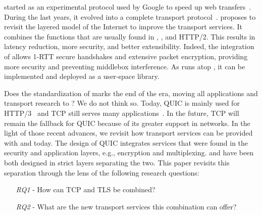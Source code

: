 \quic started as an experimental protocol used by Google to speed up web
transfers~\cite{roskind2013quic,langley2017quic}. During the last years, it
evolved into a complete transport protocol~\cite{rfc9000}.
\quic proposes to revisit the layered model of the Internet to improve the 
transport services. It combines the functions that are usually found in \tcp, 
\tls, and HTTP/2. This results in latency reduction, more security, and better 
extensibility. Indeed, the integration of  allows 1-RTT secure 
handshakes and extensive packet encryption, providing more security and 
preventing middlebox interference.
As \quic runs atop \udp, it can be implemented and deployed as a user-space library.

Does the standardization of \quic marks the end of the \tcp era, moving
all applications and transport research to \quic?  We do not think
so. Today, QUIC is mainly used for HTTP/3~\cite{http3} and TCP still serves many applications~\cite{covid19,fiveyears}.
In the future, TCP will remain the fallback for QUIC because of its greater support
in networks.
%
In the light of those recent advances, we revisit how transport services can be
provided with \tcp and \tls today. The design of QUIC integrates services
that were found in the security and application layers, e.g., encryption and multiplexing.
\tcp and \tls have been both designed in strict layers separating the two.
This paper revisits this separation through the lens of the following research questions:

\begin{itemize}
	\item[{\small{\textit{RQ1}}} -] How can TCP and TLS be 
	combined?
	\item[{\small{\textit{RQ2}}} -] What are the new transport services this combination can offer?
\end{itemize}

